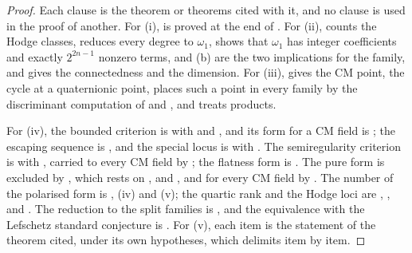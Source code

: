 \documentclass[11pt,reqno]{amsart}
\theoremstyle{plain}
\theoremstyle{definition}
\theoremstyle{remark}
\begin{document}
\begin{proof}
Each clause is the theorem or theorems cited with it, and no clause is used
in the proof of another. For (i), \cite[Theorem~1.1]{paperI} is proved at the end of
\cite[Section~17.3]{paperI}. For (ii), \cite[Theorem~4.14]{paperI} counts the Hodge
classes, \cite[Corollary~4.15]{paperI} reduces every degree to $\omega_{1}$,
\cite[Theorem~4.9(i)]{paperI} shows that $\omega_{1}$ has integer coefficients
and exactly $2^{2n-1}$ nonzero terms, \cite[Theorem~15.14(a)]{paperI} and (b) are the
two implications for the family, and \cite[Proposition~B.8]{paperI} gives the
connectedness and the dimension. For (iii), \cite[Theorem~17.5]{paperI} gives the
CM point, \cite[Theorem~15.25(v)]{paperI} the cycle at a quaternionic point,
\cite[Theorem~15.27]{paperI} places such a point in every family by the
discriminant computation of \cite[Theorem~15.25(iv)]{paperI} and \cite[Lemma~15.26]{paperI},
and \cite[Theorem~15.10]{paperI} treats products.

For (iv), the bounded criterion is \cite[Theorem~16.9]{paperI} with
\cite[Theorem~16.17]{paperI} and \cite[Theorem~16.15]{paperI}, and its form for a CM field
is \cite[Theorem~17.7(iv)]{paperI}; the escaping sequence is \cite[Theorem~17.14]{paperI},
and the special locus is \cite[Proposition~17.12]{paperI} with
\cite[Corollary~17.13]{paperI}. The semiregularity criterion is
\cite[Theorem~2.3]{paperII} with \cite[Remark~3.6]{paperII}, carried to every CM field
by \cite[Theorem~17.7(v)]{paperI}; the flatness form is \cite[Proposition~3.15]{paperII}. The
pure form is excluded by \cite[Theorem~3.5]{paperII}, which rests on
\cite[Lemma~3.2]{paperII}, \cite[Lemma~3.3]{paperII} and
\cite[Proposition~3.4]{paperII}, and for every CM field by
\cite[Theorem~5.4]{paperII}. The number of the polarised form is
\cite[Theorem~3.9(i)]{paperII},
(iv) and (v); the quartic rank and the Hodge loci are
\cite[Theorem~5.14]{paperII}, \cite[Corollary~5.15]{paperII}, \cite[Proposition~5.17]{paperII}
and \cite[Corollary~5.18]{paperII}. The reduction to the split families is
, and the equivalence with the Lefschetz standard
conjecture is . For (v), each item is the statement of
the theorem cited, under its own hypotheses, which  delimits
item by item.


\end{proof}
\end{document}
